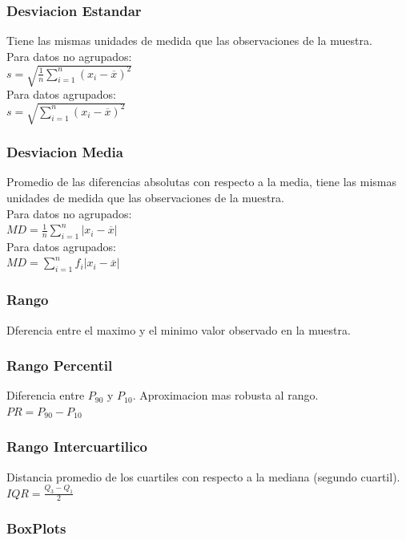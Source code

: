 \subsubsection{Desviacion Estandar}
Tiene las mismas unidades de medida que las observaciones de la muestra.\\
Para datos no agrupados:\\
$s = \sqrt{\frac{1}{n} \sum_{i=1}^n (x_i - \overline{x})^2}$\\
Para datos agrupados:\\
$s = \sqrt{\sum_{i=1}^n (x_i - \overline{x})^2}$

\subsubsection{Desviacion Media}
Promedio de las diferencias absolutas con respecto a la media, tiene las mismas unidades de medida que las observaciones de la muestra.\\
Para datos no agrupados:\\
$MD = \frac{1}{n} \sum_{i=1}^n |x_i - \overline{x}|$\\
Para datos agrupados:\\
$MD = \sum_{i=1}^n f_i|x_i - \overline{x}|$

\subsubsection{Rango}
Dferencia entre el maximo y el minimo valor observado en la muestra.

\subsubsection{Rango Percentil}
Diferencia entre $P_{90}$ y $P_{10}$. Aproximacion mas robusta al rango.\\
$PR = P_{90} - P_{10}$

\subsubsection{Rango Intercuartilico}
Distancia promedio de los cuartiles con respecto a la mediana (segundo cuartil).\\
$IQR = \frac{Q_3 - Q_1}{2}$

\subsubsection{BoxPlots}

